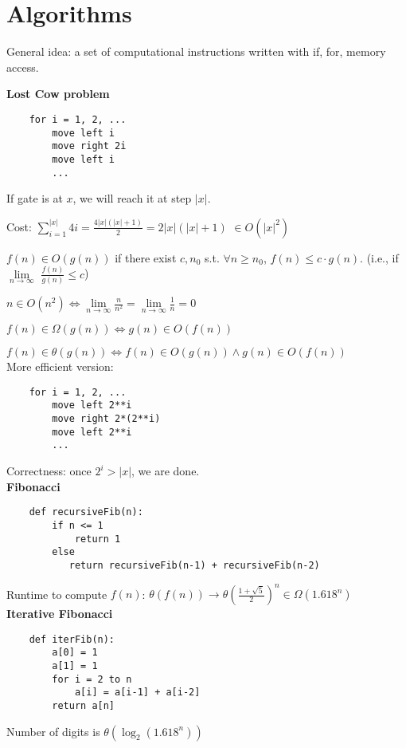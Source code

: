 \documentclass[english]{exam}
\begin{document}
	
    \section{Algorithms}
    
    General idea: a set of computational instructions written with if, for, memory access.
    
    \textbf{Lost Cow problem}
    
    \begin{lstlisting}
    for i = 1, 2, ...
        move left i
        move right 2i
        move left i
        ...
    \end{lstlisting}
    
    If gate is at $x$, we will reach it at step $|x|$.
    
    Cost: $\sum_{i=1}^{|x|} 4i = \frac{4|x|(|x|+1)}{2} = 2|x|(|x|+1)$ $\in O(|x|^2)$
    
    $f(n) \in O(g(n))$ if there exist $c, n_0$ s.t. $\forall n \geq n_0$, $f(n) \leq c \cdot g(n)$. (i.e., if $\lim\limits_{n \rightarrow \infty}$ $\frac{f(n)}{g(n)} \leq c$)
    
    $n \in O(n^2) \iff \lim\limits_{n \rightarrow \infty} \frac{n}{n^2} = \lim\limits_{n \rightarrow \infty} \frac{1}{n} = 0$
    
    $f(n) \in \Omega(g(n)) \iff g(n) \in O(f(n))$
    
    $f(n) \in \theta(g(n)) \iff  f(n) \in O(g(n)) \wedge g(n) \in O(f(n))$\\
    
    More efficient version:
    
    \begin{lstlisting}
    for i = 1, 2, ...
        move left 2**i
        move right 2*(2**i)
        move left 2**i
        ...
    \end{lstlisting}
     
    Correctness: once $2^i > |x|$, we are done.\\
    
    \textbf{Fibonacci}
    
    \begin{lstlisting}
    def recursiveFib(n):
        if n <= 1
            return 1
        else
           return recursiveFib(n-1) + recursiveFib(n-2)
    \end{lstlisting}
    
    Runtime to compute $f(n)$: $\theta(f(n)) \rightarrow \theta(\frac{1+\sqrt{5}}{2})^n \in \Omega(1.618^n)$\\
    
    \textbf{Iterative Fibonacci}
    
    \begin{lstlisting}
    def iterFib(n):
        a[0] = 1
        a[1] = 1
        for i = 2 to n
            a[i] = a[i-1] + a[i-2]
        return a[n]
    \end{lstlisting}
    
    Number of digits is $\theta(\log_2 (1.618^n))$
    
    
    
\end{document}
